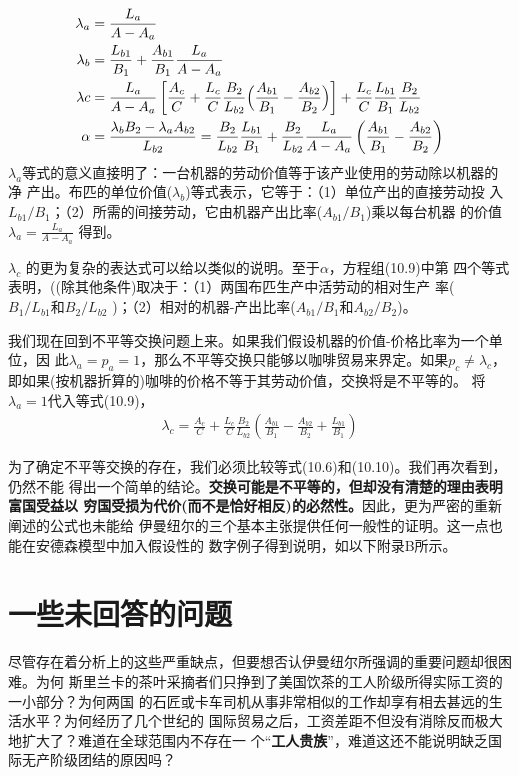 \begin{align}
  \lambda_a &= \frac{L_a}{A-A_a} \notag \\
  \lambda_b &= \frac{L_{b1}}{B_1} + \frac{A_{b1}}{B_1} \frac{L_a}{A-A_a} \notag \\
  \lambda c &= \frac{L_a}{A-A_a} \left[ \frac{A_c}{C} + \frac{L_c}{C}
    \frac{B_2}{L_{b2}} \Bigl( \frac{A_{b1}}{B_1} - \frac{A_{b2}}{B_2} \Bigr)
  \right] + \frac{L_c}{C} \frac{L_{b1}}{B_1} \frac{B_2}{L_{b2}} \notag \\
  \alpha  &= \frac{\lambda_bB_2 - \lambda_aA_{b2}}{L_{b2}} = \frac{B_2}{L_{b2}} \frac{L_{b1}}{B_1} + \frac{B_2}{L_{b2}} \frac{L_a}{A-A_a} \left( \frac{A_{b1}}{B_1}- \frac{A_{b2}}{B_2} \right)
\end{align}
$\lambda_a$等式的意义直接明了：一台机器的劳动价值等于该产业使用的劳动除以机器的净
产出。布匹的单位价值($\lambda_b$)等式表示，它等于：（1）单位产出的直接劳动投
入$L_{b1} / B_1$；（2）所需的间接劳动，它由机器产出比率($A_{b1} / B_1$)乘以每台机器
的价值$\lambda_a= \frac{L_a}{A-A_a}$ 得到。

$\lambda_c$ 的更为复杂的表达式可以给以类似的说明。至于$\alpha$，方程组(10.9)中第
四个等式表明，((除其他条件)取决于：（1）两国布匹生产中活劳动的相对生产
率($B_1 / L_{b1} 和 B_2 / L_{b2}$ )；（2）相对的机器-产出比率($A_{b1} / B_1 和
A_{b2} / B_2$)。

我们现在回到不平等交换问题上来。如果我们假设机器的价值-价格比率为一个单位，因
此$\lambda_a=p_a=1$，那么不平等交换只能够以咖啡贸易来界定。如果$p_c \neq
\lambda_c$，即如果(按机器折算的)咖啡的价格不等于其劳动价值，交换将是不平等的。
将$\lambda_a=1$代入等式(10.9)，
\begin{gather}
  \lambda_c=\frac{A_c}{C} + \frac{L_c}{C} \frac{B_2}{L_{b2}} \left(
    \frac{A_{b1}}{B_1} - \frac{A_{b2}}{B_2} + \frac{L_{b1}}{B_1} \right)
\end{gather}

为了确定不平等交换的存在，我们必须比较等式(10.6)和(10.10)。我们再次看到，仍然不能
得出一个简单的结论。\textbf{交换可能是不平等的，但却没有清楚的理由表明富国受益以
  穷国受损为代价(而不是恰好相反)的必然性。}因此，更为严密的重新阐述的公式也未能给
伊曼纽尔的三个基本主张提供任何一般性的证明。这一点也能在安德森模型中加入假设性的
数字例子得到说明，如以下附录B所示。

\section{一些未回答的问题}

尽管存在着分析上的这些严重缺点，但要想否认伊曼纽尔所强调的重要问题却很困难。为何
斯里兰卡的茶叶采摘者们只挣到了美国饮茶的工人阶级所得实际工资的一小部分？为何两国
的石匠或卡车司机从事非常相似的工作却享有相去甚远的生活水平？为何经历了几个世纪的
国际贸易之后，工资差距不但没有消除反而极大地扩大了？难道在全球范围内不存在一
个“\textbf{工人贵族}”，难道这还不能说明缺乏国际无产阶级团结的原因吗？

